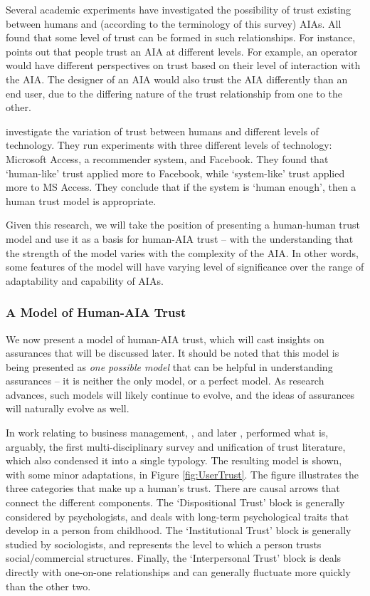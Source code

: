         Several academic experiments have investigated the possibility of trust existing between humans and (according to the terminology of this survey) AIAs. All found that some level of trust can be formed in such relationships. For instance, \citet{Lacher2014-yc} points out that people trust an AIA at different levels. For example, an operator would have different perspectives on trust based on their level of interaction with the AIA. The designer of an AIA would also trust the AIA differently than an end user, due to the differing nature of the trust relationship from one to the other. 

        \citet{Tripp2011-cq} investigate the variation of trust between humans and different levels of technology. They run experiments with three different levels of technology: Microsoft Access, a recommender system, and Facebook. They found that `human-like' trust applied more to Facebook, while `system-like' trust applied more to MS Access. They conclude that if the system is `human enough', then a human trust model is appropriate.

        Given this research, we will take the position of presenting a human-human trust model and use it as a basis for human-AIA trust -- with the understanding that the strength of the model varies with the complexity of the AIA. In other words, some features of the model will have varying level of significance over the range of adaptability and capability of AIAs.

\subsubsection{A Model of Human-AIA Trust}
        We now present a model of human-AIA trust, which will cast insights on assurances that will be discussed later. It should be noted that this model is being presented as \emph{one possible model} that can be helpful in understanding assurances -- it is neither the only model, or a perfect model. As research advances, such models will likely continue to evolve, and the ideas of assurances will naturally evolve as well.

        In work relating to business management, \citet{McKnight1998-ty}, and later \citet{McKnight2001-fa}, performed what is, arguably, the first multi-disciplinary survey and unification of trust literature, which also condensed it into a single typology. The resulting model is shown, with some minor adaptations, in Figure \ref{fig:UserTrust}. The figure illustrates the three categories that make up a human's trust. There are causal arrows that connect the different components. The `Dispositional Trust' block is generally considered by psychologists, and deals with long-term psychological traits that develop in a person from childhood. The `Institutional Trust' block is generally studied by sociologists, and represents the level to which a person trusts social/commercial structures. Finally, the `Interpersonal Trust' block is deals directly with one-on-one relationships and can generally fluctuate more quickly than the other two.

